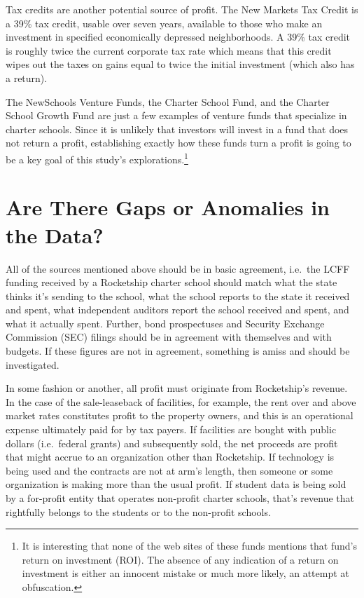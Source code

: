 Tax credits are another potential source of profit. The New Markets Tax Credit is a 39\% tax credit, usable over seven years, available to those who make an investment in specified economically depressed neighborhoods. A 39\% tax credit is roughly twice the current corporate tax rate which means that this credit wipes out the taxes on gains equal to twice the initial investment (which also has a return). 

The NewSchools Venture Funds, the Charter School Fund, and the Charter School Growth Fund are just a few examples of venture funds that specialize in charter schools. Since it is unlikely that investors will invest in a fund that does not return a profit, establishing exactly how these funds turn a profit is going to be a key goal of this study's explorations.\footnote{It is interesting that none of the web sites of these funds mentions that fund's return on investment (ROI). The absence of any indication of a return on investment is either an innocent mistake or much more likely, an attempt at obfuscation.}



\section{Are There Gaps or Anomalies in the Data?}\label{sec:gaps-anomalies}\indent

All of the sources mentioned above should be in basic agreement, i.e.~the LCFF funding received by a Rocketship charter school should match what the state thinks it's sending to the school, what the school reports to the state it received and spent, what independent auditors report the school received and spent, and what it actually spent. Further, bond prospectuses and Security Exchange Commission (SEC) filings should be in agreement with themselves and with budgets. If these figures are not in agreement, something is amiss and should be investigated.

In some fashion or another, all profit must originate from Rocketship's revenue. In the case of the sale-leaseback of facilities, for example, the rent over and above market rates constitutes profit to the property owners, and this is an operational expense ultimately paid for by tax payers. If facilities are bought with public dollars (i.e.~federal grants) and subsequently sold, the net proceeds are profit that might accrue to an organization other than Rocketship. If technology is being used and the contracts are not at arm's length, then someone or some organization is making more than the usual profit. If student data is being sold by a for-profit entity that operates non-profit charter schools, that's revenue that rightfully belongs to the students or to the non-profit schools. 

